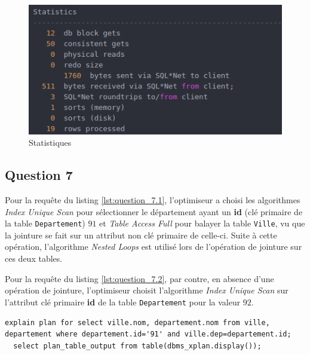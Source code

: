 \documentclass[a4paper,12pt]{article}
\begin{document}
\begin{figure}[!ht]
  \centering
  \includegraphics[scale=0.6]{images/q6_2.png}
  \caption{Statistiques}
\end{figure}

\newpage

\subsection{Question 7}
Pour la requête du listing \ref{lst:question_7.1}, l'optimiseur a choisi les algorithmes \textit{Index Unique Scan} pour sélectionner le département ayant un \textbf{id} (clé primaire de la table \texttt{Departement}) $91$ et \textit{Table Access Full} pour balayer la table \texttt{Ville}, vu que la jointure se fait sur un attribut non clé primaire de celle-ci. Suite à cette opération, l'algorithme \textit{Nested Loops} est utilisé lors de l'opération de jointure sur ces deux tables.

Pour la requête du listing \ref{lst:question_7.2}, par contre, en absence d'une opération de jointure, l'optimiseur choisit l'algorithme \textit{Index Unique Scan} sur l'attribut clé primaire \textbf{id} de la table \texttt{Departement} pour la valeur $92$.

\begin{lstlisting}[caption={requêtes permettant d'expliquer le plan d'exécution affichant le nom des villes et du département dont le numéro est 91 (id)}, label={lst:question_7.1}]
  explain plan for select ville.nom, departement.nom from ville, departement where departement.id='91' and ville.dep=departement.id;
  select plan_table_output from table(dbms_xplan.display());
\end{lstlisting}
\end{document}
